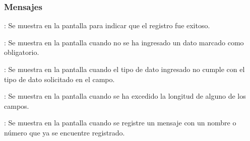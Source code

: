 \subsubsection{Mensajes}

\begin{Citemize}
	\item {}: Se muestra en la pantalla  para indicar que el registro fue exitoso.
	\item {}: Se muestra en la pantalla  cuando no se ha ingresado un dato marcado como obligatorio.
	\item {}: Se muestra en la pantalla  cuando el tipo de dato ingresado no cumple con el tipo de dato solicitado en el campo.
	\item {}: Se muestra en la pantalla  cuando se ha excedido la longitud de alguno de los campos.
	\item {}: Se muestra en la pantalla  cuando se registre un mensaje con un nombre o número que ya se encuentre registrado.
\end{Citemize}
